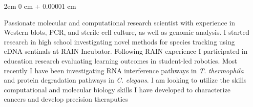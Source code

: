 \documentclass[11pt]{article}
\newenvironment{onecolentry}{
    \begin{adjustwidth}{
        2em
    }{
        0 cm + 0.00001 cm
    }
}{
    \end{adjustwidth}
} %
\begin{document}
\begin{onecolentry}
	\hspace{0.5cm} Passionate molecular and computational research scientist with experience in Western blots, PCR, and sterile cell culture,
    as well as genomic analysis.
I started research in high school investigating novel methods for species tracking using eDNA sentinals at RAIN Incubator.
Following RAIN experience I participated in education research evaluating learning outcomes in student-led robotics. Most recently I have 
	been investigating RNA interference pathways in \textit{T. thermophila} and protein degradation pathways in \textit{C. elegans}.
I am looking to utilize the skills computational and molecular biology skills I have developed to characterize cancers and develop precision theraputics

\end{onecolentry}











%
\end{document}
